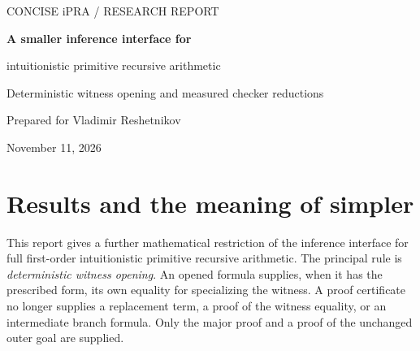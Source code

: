 \documentclass[11pt,letterpaper]{article}
\theoremstyle{definition}
\begin{document}
\thispagestyle{empty}
\begin{center}
{\small\sffamily\color{ink} CONCISE iPRA / RESEARCH REPORT}\par
\vspace{1.2em}
{\LARGE\bfseries A smaller inference interface for\par
intuitionistic primitive recursive arithmetic}\par
\vspace{.7em}
{\large Deterministic witness opening and measured checker reductions}\par
\vspace{.8em}
{Prepared for Vladimir Reshetnikov}\par
{November 11, 2026}
\end{center}
\vspace{1em}
\begin{abstract}
An equality-bearing witness elimination can determine its replacement from
one fixed instance of the formula being opened.  Specializing the opened
clause at that value leaves the outer goal unchanged and removes an
explicit replacement term, an equality-proof premise, and an intermediate
formula from the certificate interface.  The resulting presentation has
three rule families and one fixed reflexivity clause.  A bootstrap through
restricted openings and a strong substitution theorem proves equality of
the entire canonical clause consequence relation with the preceding
presentation.  It therefore preserves full first-order iPRA
bi-interpretability, whole domains, actual equality, and both identity
composites.  Its matched complete checker decreases from 2,273 to 2,253
normalized Python bytes.  Independently, a proved continuation refactor of
the existing compact calculus decreases its complete byte profile from
516 to 508 bytes and its separate AST profile from 278 to 276 nodes.
The new mathematical presentation is not the one implemented by the
508-byte checker.  Global minimality and a single-program improvement in
every size coordinate are not claimed.
\end{abstract}
\tableofcontents
\clearpage

\section{Results and the meaning of simpler}
\label{sec:results}

This report gives a further mathematical restriction of the inference
interface for full first-order intuitionistic primitive recursive arithmetic.
The principal rule is \emph{deterministic witness opening}.  An opened
formula supplies, when it has the prescribed form, its own equality for
specializing the witness.  A proof certificate no longer supplies a replacement
term, a proof of the witness equality, or an intermediate branch formula.
Only the major proof and a proof of the unchanged outer goal are supplied.
\end{document}
